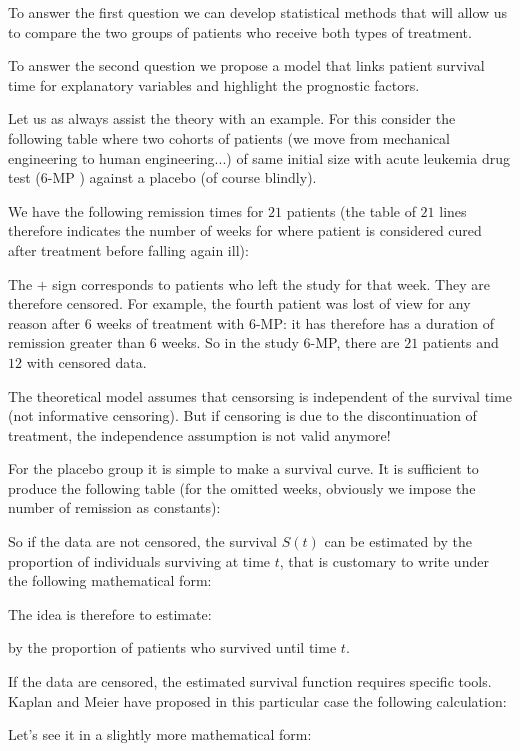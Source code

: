 	To answer the first question we can develop statistical methods that will allow us to compare the two groups of patients who receive both types of treatment.
	
	To answer the second question we propose a model that links patient survival time for explanatory variables and highlight the prognostic factors.
	
	Let us as always assist the theory with an example. For this consider the following table where two cohorts of patients (we move from mechanical engineering to human engineering...) of same initial size with acute leukemia drug test (6-MP ) against a placebo (of course blindly).
	
	We have the following remission times for $21$ patients (the table of $21$ lines therefore indicates the number of weeks for where patient is considered cured after treatment before falling again ill):
	
	The $+$ sign corresponds to patients who left the study for that week. They are therefore censored. For example, the fourth patient was lost of view for any reason after $6$ weeks of treatment with 6-MP: it has therefore has a duration of remission greater than $6$ weeks. So in the study 6-MP, there are $21$ patients and $12$ with censored data.
	
	\begin{tcolorbox}[title=Remark,colframe=black,arc=10pt]
	The theoretical model assumes that censorsing is independent of the survival time (not informative censoring). But if censoring is due to the discontinuation of treatment, the independence assumption is not valid anymore!
	\end{tcolorbox}
	For the placebo group it is simple to make a survival curve. It is sufficient to produce the following table (for the omitted weeks, obviously we impose the number of remission as constants):
	
	So if the data are not censored, the survival $S(t)$ can be estimated by the proportion of individuals surviving at time $t$, that is customary to write under the following mathematical form:
	
	The idea is therefore to estimate:
	
	by the proportion of patients who survived until time $t$.
	
	If the data are censored, the estimated survival function requires specific tools. Kaplan and Meier have proposed in this particular case the following calculation:
	
	Let's see it in a slightly more mathematical form:
	
